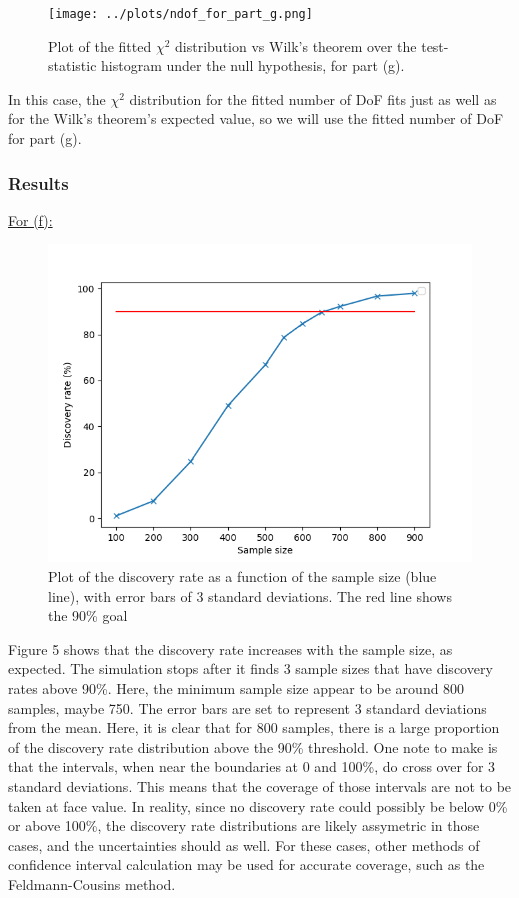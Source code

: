 \documentclass[12pt]{report} %
\begin{document}
\begin{figure}[t]
    \centering
    \texttt{[image: ../plots/ndof\_for\_part\_g.png]}
    \captionsetup{margin=1.3cm}
    \caption[width=0.2\pdfpagewidth]{Plot of the fitted $\chi^{2}$ distribution vs Wilk's theorem over the test-statistic histogram under the null hypothesis, for part (g).}
\end{figure}
\newpage
In this case, the $\chi^{2}$ distribution for the fitted number of DoF fits just as well as for the Wilk's theorem's expected value, so we will use the fitted number of DoF for part (g).

\subsubsection*{Results}

\underline{For (f):}

\begin{figure}[htb]
    \centering
    \includegraphics[width=\textwidth]{../plots/plot_f.png}
    \captionsetup{margin=1.3cm}
    \caption[width=0.2\pdfpagewidth]{Plot of the discovery rate as a function of the sample size (blue line), with error bars of 3 standard deviations. The red line shows the 90\% goal}
\end{figure}
\vspace{1\baselineskip}
Figure 5 shows that the discovery rate increases with the sample size, as expected. The simulation stops after it finds 3 sample sizes that have discovery rates above 90\%. Here, the minimum sample size appear to be around 800 samples, maybe 750. The error bars are set to represent 3 standard deviations from the mean. Here, it is clear that for 800 samples, there is a large proportion of the discovery rate distribution above the 90\% threshold. One note to make is that the intervals, when near the boundaries at 0 and 100\%, do cross over for 3 standard deviations. This means that the coverage of those intervals are not to be taken at face value. In reality, since no discovery rate could possibly be below 0\% or above 100\%, the discovery rate distributions are likely assymetric in those cases, and the uncertainties should as well. For these cases, other methods of confidence interval calculation may be used for accurate coverage, such as the Feldmann-Cousins method\cite{PhysRevD.57.3873}. 
\end{document}
